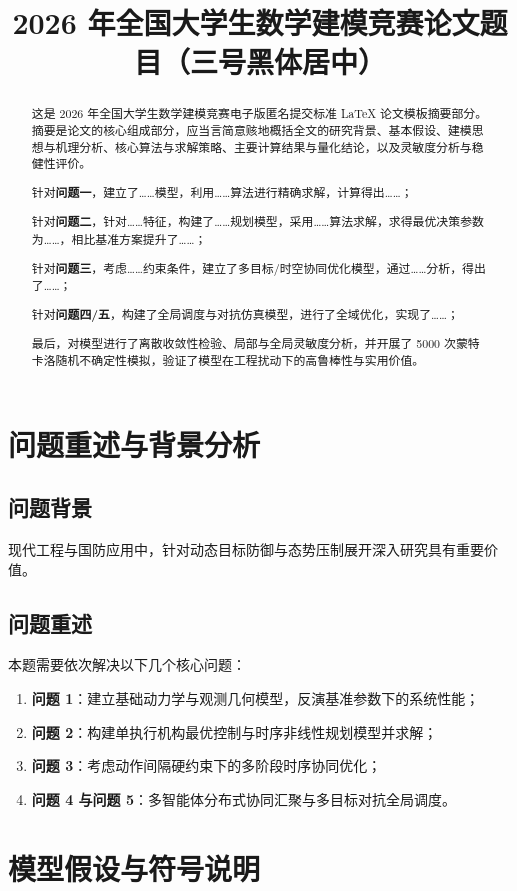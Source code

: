\documentclass{cumcmthesis}
\title{2026 年全国大学生数学建模竞赛论文题目（三号黑体居中）}
\begin{document}
\begin{abstract}
这是 2026 年全国大学生数学建模竞赛电子版匿名提交标准 \LaTeX{} 论文模板摘要部分。摘要是论文的核心组成部分，应当言简意赅地概括全文的研究背景、基本假设、建模思想与机理分析、核心算法与求解策略、主要计算结果与量化结论，以及灵敏度分析与稳健性评价。

针对\textbf{问题一}，建立了……模型，利用……算法进行精确求解，计算得出……；

针对\textbf{问题二}，针对……特征，构建了……规划模型，采用……算法求解，求得最优决策参数为……，相比基准方案提升了……；

针对\textbf{问题三}，考虑……约束条件，建立了多目标/时空协同优化模型，通过……分析，得出了……；

针对\textbf{问题四/五}，构建了全局调度与对抗仿真模型，进行了全域优化，实现了……；

最后，对模型进行了离散收敛性检验、局部与全局灵敏度分析，并开展了 5000 次蒙特卡洛随机不确定性模拟，验证了模型在工程扰动下的高鲁棒性与实用价值。

\end{abstract}

\section{问题重述与背景分析}
\subsection{问题背景}
现代工程与国防应用中，针对动态目标防御与态势压制展开深入研究具有重要价值\cite{smith2018smoke, li2021uav}。

\subsection{问题重述}
本题需要依次解决以下几个核心问题：
\begin{enumerate}
    \item \textbf{问题 1}：建立基础动力学与观测几何模型，反演基准参数下的系统性能；
    \item \textbf{问题 2}：构建单执行机构最优控制与时序非线性规划模型并求解；
    \item \textbf{问题 3}：考虑动作间隔硬约束下的多阶段时序协同优化；
    \item \textbf{问题 4 与问题 5}：多智能体分布式协同汇聚与多目标对抗全局调度。
\end{enumerate}

\section{模型假设与符号说明}
\end{document}
